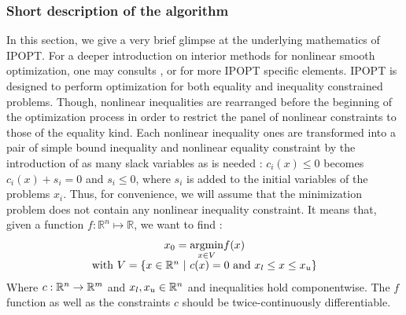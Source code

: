\documentclass[a4paper,twoside,12pt]{book}
\begin{document}
\subsubsection{Short description of the algorithm}
 In this section, we give a very brief glimpse at the underlying mathematics of IPOPT. For a deeper introduction on interior methods for nonlinear smooth optimization, one may consults \cite{ipintro}, or \cite{ipopt} for more IPOPT specific elements. IPOPT is designed to perform optimization for both equality and inequality constrained problems. Though, nonlinear inequalities are rearranged before the beginning of the optimization process in order to restrict the panel of nonlinear constraints to those of the equality kind. Each nonlinear inequality ones are transformed into a pair of simple bound inequality and nonlinear equality constraint by the introduction of as many slack variables as is needed : $c_{i}(x)\leq 0$ becomes $c_{i}(x) + s_{i} = 0$ and $s_{i}\leq 0$, where $s_{i}$ is added to the initial variables of the problems $x_{i}$.  
 Thus, for convenience, we will assume that the minimization problem does not contain any nonlinear inequality constraint. It means that, given a function $f:\mathbb{R}^{n}\mapsto\mathbb{R}$, we want to find :
 \begin{equation}\label{minimproblem}
 \begin{array} {c}
 x_{0} = \underset{x\in V}{\operatorname{argmin}} f(x) \\
 \mathrm{with}\ V = \left\lbrace x\in\R^{n}\ \vert\ c(x)= 0 \ \text{and}\ x_{l}\leq x\leq x_{u}\right\rbrace 
 \end{array}
 \end{equation}
Where $c:\mathbb{R}^{n}\rightarrow\mathbb{R}^{m}$ and $x_{l},x_{u}\in\mathbb{R}^{n}$ and inequalities hold componentwise.
The $f$ function as well as the constraints $c$ should be twice-continuously differentiable.
\end{document}
